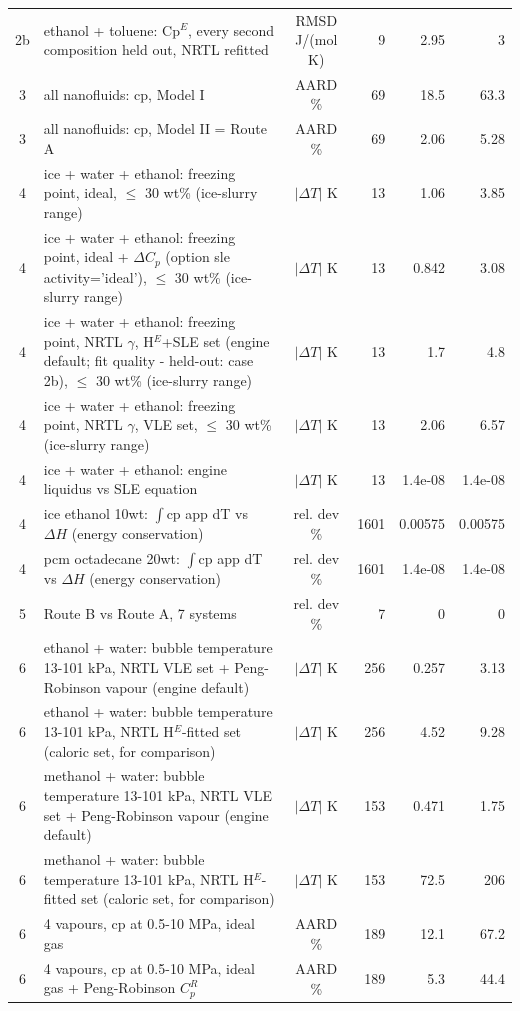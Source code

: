 \begin{tabular}{c p{8.6cm} c r r r}
2b & ethanol + toluene: Cp$^E$, every second composition held out, NRTL refitted & RMSD J/(mol K) & 9 & 2.95 & 3 \\
3 & all nanofluids: cp, Model I & AARD \% & 69 & 18.5 & 63.3 \\
3 & all nanofluids: cp, Model II = Route A & AARD \% & 69 & 2.06 & 5.28 \\
4 & ice + water + ethanol: freezing point, ideal, $\le$ 30 wt\% (ice-slurry range) & $|\Delta T|$ K & 13 & 1.06 & 3.85 \\
4 & ice + water + ethanol: freezing point, ideal + $\Delta C_p$ (option sle activity='ideal'), $\le$ 30 wt\% (ice-slurry range) & $|\Delta T|$ K & 13 & 0.842 & 3.08 \\
4 & ice + water + ethanol: freezing point, NRTL $\gamma$, H$^E$+SLE set (engine default; fit quality - held-out: case 2b), $\le$ 30 wt\% (ice-slurry range) & $|\Delta T|$ K & 13 & 1.7 & 4.8 \\
4 & ice + water + ethanol: freezing point, NRTL $\gamma$, VLE set, $\le$ 30 wt\% (ice-slurry range) & $|\Delta T|$ K & 13 & 2.06 & 6.57 \\
4 & ice + water + ethanol: engine liquidus vs SLE equation & $|\Delta T|$ K & 13 & 1.4e-08 & 1.4e-08 \\
4 & ice ethanol 10wt: $\int$cp app dT vs $\Delta H$ (energy conservation) & rel. dev \% & 1601 & 0.00575 & 0.00575 \\
4 & pcm octadecane 20wt: $\int$cp app dT vs $\Delta H$ (energy conservation) & rel. dev \% & 1601 & 1.4e-08 & 1.4e-08 \\
5 & Route B vs Route A, 7 systems & rel. dev \% & 7 & 0 & 0 \\
6 & ethanol + water: bubble temperature 13-101 kPa, NRTL VLE set + Peng-Robinson vapour (engine default) & $|\Delta T|$ K & 256 & 0.257 & 3.13 \\
6 & ethanol + water: bubble temperature 13-101 kPa, NRTL H$^E$-fitted set (caloric set, for comparison) & $|\Delta T|$ K & 256 & 4.52 & 9.28 \\
6 & methanol + water: bubble temperature 13-101 kPa, NRTL VLE set + Peng-Robinson vapour (engine default) & $|\Delta T|$ K & 153 & 0.471 & 1.75 \\
6 & methanol + water: bubble temperature 13-101 kPa, NRTL H$^E$-fitted set (caloric set, for comparison) & $|\Delta T|$ K & 153 & 72.5 & 206 \\
6 & 4 vapours, cp at 0.5-10 MPa, ideal gas & AARD \% & 189 & 12.1 & 67.2 \\
6 & 4 vapours, cp at 0.5-10 MPa, ideal gas + Peng-Robinson $C_p^R$ & AARD \% & 189 & 5.3 & 44.4 \\

\end{tabular}
